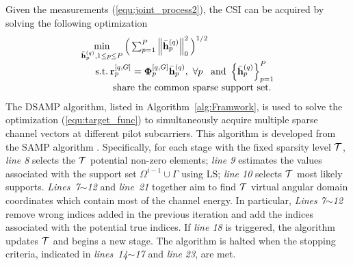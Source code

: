 \documentclass[final]{IEEEtran}
\begin{document}
 Given the measurements (\ref{equ:joint_process2}), the CSI can be acquired by solving the
 following optimization
\begin{align}\label{equ:target_func} %
\begin{array}{l}
 \min\limits_{\bar{\bf h}_p^{(q)}, 1\le p\le P} \Big( \sum\nolimits_{p=1}^{P}
 \left\| \bar{\bf h}_p^{(q)} \right\|_0^2 \Big)^{1/2} \\
 {\kern 15pt} {\rm s.t.} {\kern 2pt} {\bf r}_p^{[q,G]} = {\bf{\Phi}}_p^{[q,G]} \bar{\bf h}_p^{(q)},~{\forall p}
  \,~~{\rm and} ~ \left\{ \bar{\bf h}_p^{(q)} \right\}_{p=1}^{P}  \\ {\kern 30pt}
 \mbox{ share the common sparse support set.}
\end{array}
\end{align}
 The DSAMP algorithm, listed in Algorithm~\ref{alg:Framwork}, is used to solve the
 optimization (\ref{equ:target_func}) to simultaneously acquire multiple sparse channel
 vectors at different pilot subcarriers. This algorithm is developed from the
 SAMP algorithm \cite{SAMP}. Specifically, for each stage with the fixed sparsity level
 $\cal{T}$, {\it line 8} selects the $\cal{T}$ potential non-zero elements;  {\it line 9}
 estimates the values associated with the support set $\Omega^{i-1} \cup \Gamma$ using LS;
 {\it line 10} selects $\cal{T}$ most likely supports. {\it Lines~7}$\sim${\it  12} and
 {\it line~21} together aim to find $\cal{T}$ virtual angular domain coordinates which
 contain most of the channel energy. In particular, {\it Lines 7$\sim$12} remove wrong
 indices added in the previous iteration and add the indices associated with the potential
 true indices. If \emph{line 18} is triggered, the algorithm updates $\cal{T}$ and begins
 a new stage. The algorithm is halted when the stopping criteria, indicated in
 \emph{lines~14}$\sim$\emph{17} and \emph{line 23}, are met.
\end{document}
